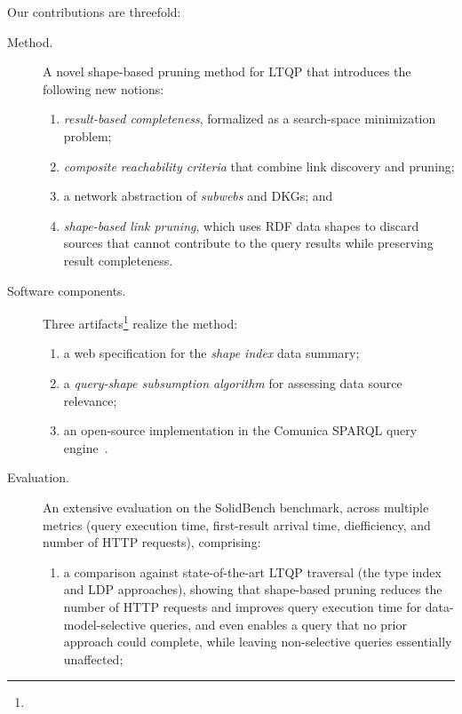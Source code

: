 \begin{Rboth}
	Our contributions are threefold:
	\begin{description}
		\item[Method.] A novel shape-based pruning method for \ac{LTQP} that introduces the following new notions:
		      \begin{enumerate}[label=(\roman*)]
			      \item \emph{result-based completeness}, formalized as a search-space minimization problem;
			      \item \emph{composite reachability criteria} that combine link discovery and pruning;
			      \item a network abstraction of \emph{subwebs} and \acp{DKG}; and
			      \item \emph{shape-based link pruning}, which uses \ac{RDF} data shapes to discard sources that cannot contribute to the query results while preserving result completeness.
		      \end{enumerate}
		\item[Software components.] Three artifacts\footnote{} realize the method:
		      \begin{enumerate}[label=(\roman*)]
			      \item a web specification for the \emph{shape index} data summary;
			      \item a \emph{query-shape subsumption algorithm} for assessing data source relevance;
			      \item an open-source implementation in the Comunica SPARQL query engine~\cite{taelman_iswc_resources_comunica_2018}.
		      \end{enumerate}
		\item[Evaluation.] An extensive evaluation on the SolidBench benchmark, across multiple metrics (query execution time, first-result arrival time, diefficiency, and number of \ac{HTTP} requests), comprising:
		      \begin{enumerate}[label=(\roman*)]
			      \item a comparison against state-of-the-art \ac{LTQP} traversal (the type index and \ac{LDP} approaches), showing that shape-based pruning reduces the number of \ac{HTTP} requests and improves query execution time for data-model-selective queries, and even enables a query that no prior approach could complete, while leaving non-selective queries essentially unaffected;

\end{enumerate}
\end{description}
\end{Rboth}
